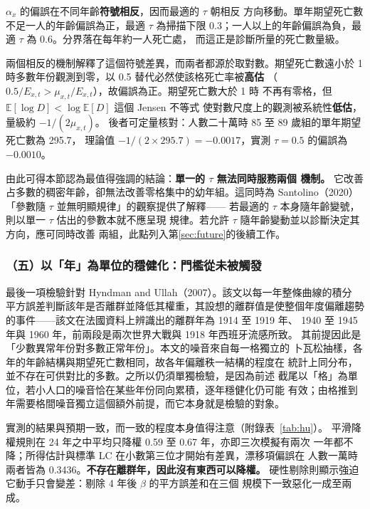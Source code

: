 \documentclass[UTF8, fontset=macnew, a4paper, 12pt]{ctexart}
\newcommand{\cn}[1]{\ding{\number\numexpr171+#1\relax}}
\begin{document}
$\alpha_x$ 的偏誤在不同年齡\textbf{符號相反}，因而最適的 $\tau$ 朝相反
方向移動。單年期望死亡數不足一人的年齡偏誤為正，最適 $\tau$ 為掃描下限
0.3；一人以上的年齡偏誤為負，最適 $\tau$ 為 0.6。分界落在每年約一人死亡處，
而這正是診斷\cn{1}所量的死亡數量級。

兩個相反的機制解釋了這個符號差異，而兩者都源於取對數。期望死亡數遠小於 1
時多數年份觀測到零，以 0.5 替代必然使該格死亡率被\textbf{高估}
（$0.5/E_{x,t}>\mu_{x,t}/E_{x,t}$），故偏誤為正。期望死亡數大於 1 時
不再有零格，但 $\mathbb{E}[\log D]<\log\mathbb{E}[D]$ 這個 Jensen 不等式
使對數尺度上的觀測被系統性\textbf{低估}，量級約 $-1/(2\mu_{x,t})$。
後者可定量核對：人數二十萬時 85 至 89 歲組的單年期望死亡數為 295.7，
理論值 $-1/(2\times295.7)=-0.0017$，實測 $\tau=0.5$ 的偏誤為 $-0.0010$。

由此可得本節認為最值得強調的結論：\textbf{單一的 $\tau$ 無法同時服務兩個
機制。} 它改善占多數的稠密年齡，卻無法改善零格集中的幼年組。這同時為
Santolino（2020）「參數隨 $\tau$ 並無明顯規律」的觀察提供了解釋——
若最適的 $\tau$ 本身隨年齡變號，則以單一 $\tau$ 估出的參數本就不應呈現
規律。若允許 $\tau$ 隨年齡變動並以診斷\cn{1}決定其方向，應可同時改善
兩組，此點列入第\ref{sec:future}的後續工作。

\subsubsection{（五）以「年」為單位的穩健化：門檻從未被觸發}

最後一項檢驗針對 Hyndman and Ullah（2007）。該文以每一年整條曲線的積分
平方誤差判斷該年是否離群並降低其權重，其設想的離群值是使整個年度偏離趨勢
的事件——該文在法國資料上辨識出的離群年為 1914 至 1919 年、
1940 至 1945 年與 1960 年，前兩段是兩次世界大戰與 1918 年西班牙流感所致。
其前提因此是「少數異常年份對多數正常年份」。本文的噪音來自每一格獨立的
卜瓦松抽樣，各年的年齡結構與期望死亡數相同，故各年偏離秩一結構的程度在
統計上同分布，並不存在可供對比的多數。之所以仍須單獨檢驗，是因為前述
截尾以「格」為單位，若小人口的噪音恰在某些年份同向累積，逐年穩健化仍可能
有效；由格推到年需要格間噪音獨立這個額外前提，而它本身就是檢驗的對象。

實測的結果與預期一致，而一致的程度本身值得注意（附錄表~\ref{tab:hu}）。
平滑降權規則在 24 年之中平均只降權 0.59 至 0.67 年，亦即三次模擬有兩次
一年都不降；所得估計與標準 LC 在小數第三位才開始有差異，漂移項偏誤在
人數一萬時兩者皆為 0.3436。\textbf{不存在離群年，因此沒有東西可以降權。}
硬性剔除則顯示強迫它動手只會變差：剔除 4 年後 $\beta$ 的平方誤差和在三個
規模下一致惡化一成至兩成。
\end{document}
